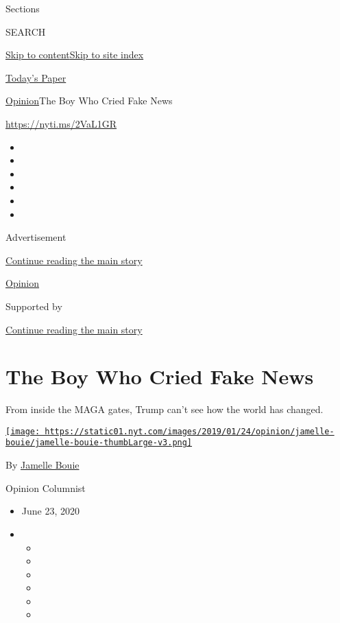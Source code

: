 Sections

SEARCH

\protect\hyperlink{site-content}{Skip to
content}\protect\hyperlink{site-index}{Skip to site index}

\href{https://myaccount.nytimes.com/auth/login?response_type=cookie\&client_id=vi}{}

\href{https://www.nytimes.com/section/todayspaper}{Today's Paper}

\href{/section/opinion}{Opinion}\textbar{}The Boy Who Cried Fake News

\href{https://nyti.ms/2VaL1GR}{https://nyti.ms/2VaL1GR}

\begin{itemize}
\item
\item
\item
\item
\item
\item
\end{itemize}

Advertisement

\protect\hyperlink{after-top}{Continue reading the main story}

\href{/section/opinion}{Opinion}

Supported by

\protect\hyperlink{after-sponsor}{Continue reading the main story}

\hypertarget{the-boy-who-cried-fake-news}{%
\section{The Boy Who Cried Fake
News}\label{the-boy-who-cried-fake-news}}

From inside the MAGA gates, Trump can't see how the world has changed.

\href{https://www.nytimes.com/column/jamelle-bouie}{\texttt{[image: https://static01.nyt.com/images/2019/01/24/opinion/jamelle-bouie/jamelle-bouie-thumbLarge-v3.png]}}

By \href{https://www.nytimes.com/column/jamelle-bouie}{Jamelle Bouie}

Opinion Columnist

\begin{itemize}
\item
  June 23, 2020
\item
  \begin{itemize}
  \item
  \item
  \item
  \item
  \item
  \item
  \end{itemize}
\end{itemize}

